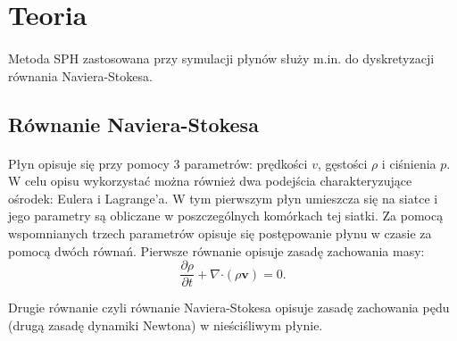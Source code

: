 \newpage

\section{Teoria}

\paragraph{}
Metoda SPH zastosowana przy symulacji płynów służy m.in. do dyskretyzacji równania Naviera-Stokesa.
\par

\subsection{Równanie Naviera-Stokesa}
\label{subsec:navier_stokes_ss}

\paragraph{}
Płyn opisuje się przy pomocy 3 parametrów: prędkości $v$, gęstości $\rho$ i ciśnienia $p$. W celu opisu wykorzystać można również dwa podejścia charakteryzujące ośrodek: Eulera i Lagrange'a. W tym pierwszym płyn umieszcza się na siatce i jego parametry są obliczane w poszczególnych komórkach tej siatki. Za pomocą wspomnianych trzech parametrów opisuje się postępowanie płynu w czasie za pomocą dwóch równań. Pierwsze równanie opisuje zasadę zachowania masy:
\begin{equation}
\frac{\partial {\rho}}{\partial t} + \nabla \boldsymbol{\cdot} (\rho \boldsymbol{v}) = 0.
\label{eqn:mass_conservation}
\end{equation}

Drugie równanie czyli równanie Naviera-Stokesa opisuje zasadę zachowania pędu (drugą zasadę dynamiki Newtona) w nieściśliwym płynie.

